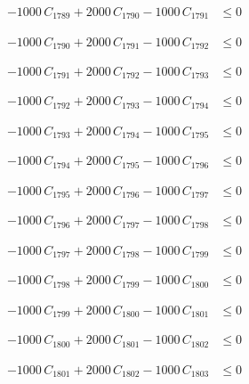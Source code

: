 \documentclass[a4paper,11pt]{article}
\begin{document}
\begin{align}
-1000\,C_{1789} + 2000\,C_{1790} - 1000\,C_{1791} &\leq 0 \nonumber
\end{align}

\begin{align}
-1000\,C_{1790} + 2000\,C_{1791} - 1000\,C_{1792} &\leq 0 \nonumber
\end{align}

\begin{align}
-1000\,C_{1791} + 2000\,C_{1792} - 1000\,C_{1793} &\leq 0 \nonumber
\end{align}

\begin{align}
-1000\,C_{1792} + 2000\,C_{1793} - 1000\,C_{1794} &\leq 0 \nonumber
\end{align}

\begin{align}
-1000\,C_{1793} + 2000\,C_{1794} - 1000\,C_{1795} &\leq 0 \nonumber
\end{align}

\begin{align}
-1000\,C_{1794} + 2000\,C_{1795} - 1000\,C_{1796} &\leq 0 \nonumber
\end{align}

\begin{align}
-1000\,C_{1795} + 2000\,C_{1796} - 1000\,C_{1797} &\leq 0 \nonumber
\end{align}

\begin{align}
-1000\,C_{1796} + 2000\,C_{1797} - 1000\,C_{1798} &\leq 0 \nonumber
\end{align}

\begin{align}
-1000\,C_{1797} + 2000\,C_{1798} - 1000\,C_{1799} &\leq 0 \nonumber
\end{align}

\begin{align}
-1000\,C_{1798} + 2000\,C_{1799} - 1000\,C_{1800} &\leq 0 \nonumber
\end{align}

\begin{align}
-1000\,C_{1799} + 2000\,C_{1800} - 1000\,C_{1801} &\leq 0 \nonumber
\end{align}

\begin{align}
-1000\,C_{1800} + 2000\,C_{1801} - 1000\,C_{1802} &\leq 0 \nonumber
\end{align}

\begin{align}
-1000\,C_{1801} + 2000\,C_{1802} - 1000\,C_{1803} &\leq 0 \nonumber
\end{align}
\end{document}

